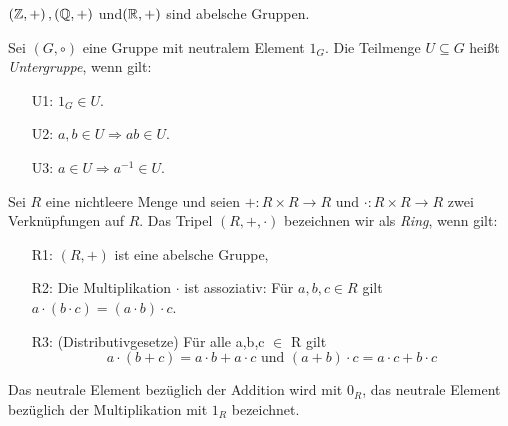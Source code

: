 %
\begin{bsp}
$\left( \mathbb{Z}, +\right), \left(\mathbb{Q}, +\right)$ und$\left(\mathbb{R}, +\right)$ sind abelsche Gruppen. 
\end{bsp}
%
\begin{defn}\label{Untergruppe}
Sei $\left(G, \circ\right)$ eine Gruppe mit neutralem Element $1_G$. Die Teilmenge $U\subseteq G$ heißt \textit{Untergruppe}, wenn gilt:
\begin{enumerate}
\item[U1: ] $1_G \in U$.
\item[U2: ] $a, b \in U \Rightarrow ab \in U$.
\item[U3: ] $a \in U \Rightarrow a^{-1} \in U$.
\end{enumerate} 
\end{defn}


\begin{defn}\label{Ring} %
Sei $R$ eine nichtleere Menge und seien $+ : R \times R \to R \text{ und } \cdot: R \times R \to R $ zwei Verknüpfungen auf $R$. Das Tripel $\left(R, +, \cdot\right)$ bezeichnen wir als \textit{Ring}, wenn gilt:
%
\begin{enumerate}
\item[R1: ] $(R, +)$ ist eine abelsche Gruppe,
\item[R2: ] Die Multiplikation $\cdot$ ist assoziativ: Für $a, b,c \in R$ gilt $a\cdot \left(b \cdot c\right) = \left(a \cdot b \right) \cdot c$.%
\item[R3: ] (Distributivgesetze) Für alle a,b,c $\in$ R gilt\\
\[a \cdot(b +c) = a \cdot b + a \cdot c \text{ und }
(a+b) \cdot c = a \cdot c + b \cdot c \] 
\end{enumerate}
\end{defn}
Das neutrale Element bezüglich der Addition wird mit \textbf{$0_R$}, das neutrale Element bezüglich der Multiplikation mit \textbf{$1_R$} bezeichnet.

